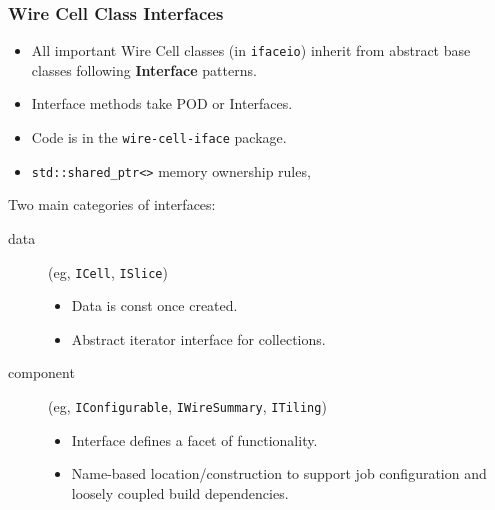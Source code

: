 \documentclass[xcolor=dvipsnames]{beamer}
\begin{document}
\begin{frame}[fragile]
  \frametitle{Wire Cell Class Interfaces}

  \vspace{5mm}
  \footnotesize

  \begin{itemize}
  \item All important Wire Cell classes (in \texttt{ifaceio}) inherit
    from abstract base classes following \textbf{Interface} patterns.
  \item Interface methods take POD or Interfaces.
  \item Code is in the \texttt{wire-cell-iface} package.
  \item \verb|std::shared_ptr<>| memory ownership rules,
  \end{itemize}

  \footnotesize

  Two main categories of interfaces:
  \begin{description}
  \item[data] (eg, \texttt{ICell}, \texttt{ISlice})
    \begin{itemize}
    \item Data is const once created.
    \item Abstract iterator interface for collections.
    \end{itemize}
  \item[component] (eg, \texttt{IConfigurable}, \texttt{IWireSummary},
    \texttt{ITiling})
    \begin{itemize}
    \item Interface defines a facet of functionality.
    \item Name-based location/construction to support job
      configuration and loosely coupled build dependencies.
    \end{itemize}
  \end{description}


\end{frame}
\end{document}
